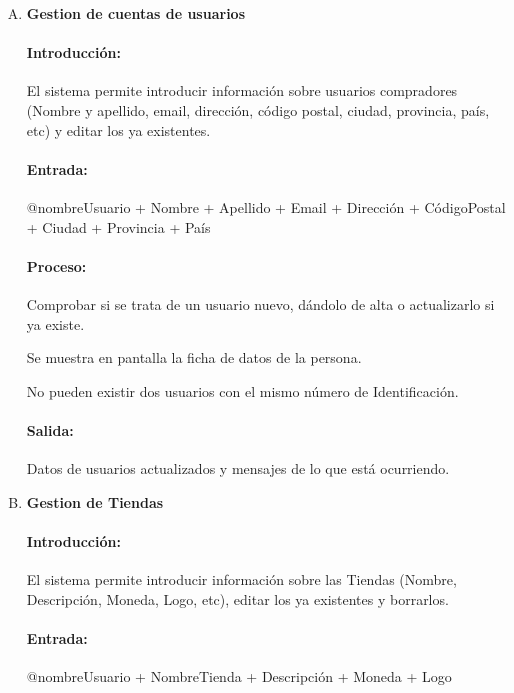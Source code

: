         \begin{enumerate}[A.]

        \item \textbf{Gestion de cuentas de usuarios}
        
        \paragraph{Introducción:} El sistema permite introducir información sobre usuarios compradores (Nombre y apellido, email, dirección, código postal, ciudad, provincia, país, etc) y editar los ya existentes.
        
        \paragraph{Entrada:} @nombreUsuario + Nombre + Apellido + Email + Dirección + CódigoPostal + Ciudad + Provincia + País
        
        \paragraph{Proceso:} Comprobar si se trata de un usuario nuevo, dándolo de alta o actualizarlo si ya existe.                  

Se muestra en pantalla la ficha de datos de la persona.

No pueden existir dos usuarios con el mismo número de Identificación. 
        
        \paragraph{Salida:}  Datos de usuarios actualizados y mensajes de lo que está ocurriendo.
        

        \item \textbf{Gestion de Tiendas}
        
        \paragraph{Introducción:}El sistema permite introducir información sobre las Tiendas (Nombre, Descripción, Moneda, Logo, etc), editar los ya existentes y borrarlos. 
        
        \paragraph{Entrada:} @nombreUsuario + NombreTienda + Descripción + Moneda + Logo 
        

\end{enumerate}
